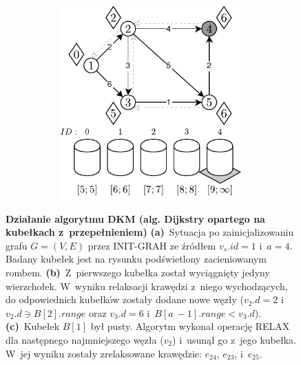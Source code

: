 \begin{figure}[!htbp]
\begin{subfigure}[b]{\textwidth}
\begin{subfigure}[b]{0.32\textwidth}
			\caption{}
			\label{fig:exampleOverflowBucket:e}
		\end{subfigure}
		\hfill
		\begin{subfigure}[b]{0.32\textwidth}
			\includegraphics[width=\textwidth]{Chapter_II/OVERFLOW-BUCKET-Example/f.pdf}
			\caption{}
			\label{fig:exampleOverflowBucket:f}
		\end{subfigure}
		\hfill\null
	\end{subfigure}
	\caption{
		\textbf{Działanie algorytmu DKM (alg. Dijkstry opartego na kubełkach z~przepełnieniem)}
		\textbf{(a)}~Sytuacja po zainicjalizowaniu grafu $G = \left( V, E \right)$ przez \textsf{INIT-GRAH} ze źródłem $v_{s}.id = 1$ i~$a = 4$.
		Badany kubełek jest na rysunku podświetlony zacieniowanym rombem.
		\textbf{(b)}~Z~pierwszego kubełka został wyciągnięty jedyny wierzchołek.
		W~wyniku relaksacji krawędzi z~niego wychodzących, do odpowiednich kubełków zostały dodane nowe węzły ($v_{2}.d = 2$ i~$ v_{2}.d \ni B \left[ 2 \right].range$ oraz $v_{3}.d = 6$ i~$ B \left[ a~- 1 \right].range < v_{3}.d $).
		\textbf{(c)}~Kubełek $B \left[ 1 \right]$ był pusty.
		Algorytm wykonał operację \textsf{RELAX} dla następnego najmniejszego węzła ($v_{2}$) i~usunął go z~jego kubełka.
		W~jej wyniku zostały zrelaksowane krawędzie: $e_{24}$, $e_{23}$, i~$e_{25}$.
}
\end{figure}
